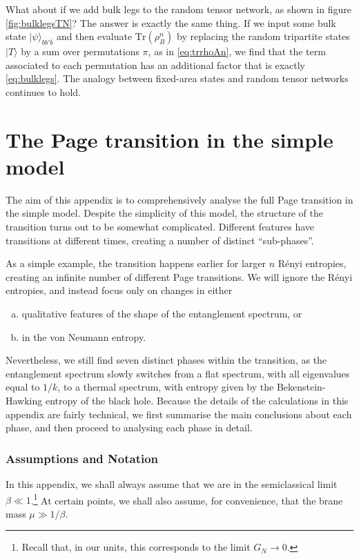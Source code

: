 \documentclass[11pt]{article}
\numberwithin{equation}{section}
\def\tr{\text{Tr}}
\begin{document}
What about if we add bulk legs to the random tensor network, as shown in figure \ref{fig:bulklegsTN}? The answer is exactly the same thing. If we input some bulk state $|\psi\rangle_{b b' \bar b}$ and then evaluate $\tr(\rho_B^n)$ by replacing the random tripartite states $| T \rangle$ by a sum over permutations $\pi$, as in \eqref{eq:trrhoAn}, we find that the term associated to each permutation has an additional factor that is exactly \eqref{eq:bulklegs}. The analogy between fixed-area states and random tensor networks continues to hold.

\section{The Page transition in the simple model}\label{app:pagephases}
The aim of this appendix is to comprehensively analyse the full Page transition in the simple model. Despite the simplicity of this model, the structure of the transition turns out to be somewhat complicated. Different features have transitions at different times, creating a number of distinct ``sub-phases''. 

As a simple example, the transition happens earlier for larger $n$ R\'{e}nyi entropies, creating an infinite number of different Page transitions. We will ignore the R\'{e}nyi entropies, and instead focus only on changes in either
\begin{enumerate}[(a)]
\item qualitative features of the shape of the entanglement spectrum, or 
\item in the von Neumann entropy. 
\end{enumerate}
Nevertheless, we still find seven distinct phases within the transition, as the entanglement spectrum slowly switches from a flat spectrum, with all eigenvalues equal to $1/k$, to a thermal spectrum, with entropy given by the Bekenstein-Hawking entropy of the black hole. Because the details of the calculations in this appendix are fairly technical, we first summarise the main conclusions about each phase, and then proceed to analysing each phase in detail. 

\subsubsection*{Assumptions and Notation}
In this appendix, we shall always assume that we are in the semiclassical limit $\beta \ll 1$.\footnote{Recall that, in our units, this corresponds to the limit $G_N \to 0$.} At certain points, we shall also assume, for convenience, that the brane mass $\mu \gg 1/\beta$.
\end{document}
